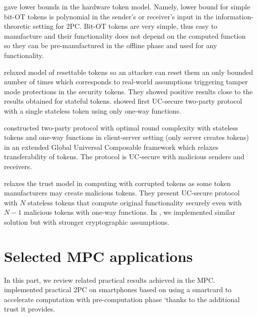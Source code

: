 \documentclass[
  digital, %
  twoside, %
  table,   %
  lof,     %
  lot,     %
]{fithesis3}
\newcounter{ph4_show_guides}
\theoremstyle{definition}
\theoremstyle{remark}
\begin{document}
\cite{AAGPR13} gave lower bounds in the hardware token model. Namely, lower bound for simple bit-OT tokens is polynomial in the sender's or receiver's input in the information-theoretic setting for 2PC. Bit-OT tokens are very simple, thus easy to manufacture and their functionality does not depend on the computed function so they can be pre-manufactured in the offline phase and used for any functionality.

\cite{DKMN15} relaxed model of resettable tokens so an attacker can reset them an only bounded number of times which corresponds to real-world assumptions triggering tamper mode protections in the security tokens. They showed positive results close to the results obtained for stateful tokens. \cite{DKMN15b} showed first UC-secure two-party protocol with a single stateless token using only one-way functions.

\cite{HPV16} constructed two-party protocol with optimal round complexity with stateless tokens and one-way functions in client-server setting (only server creates tokens) in an extended Global Universal Composable framework which relaxes transferability of tokens. The protocol is UC-secure with malicious senders and receivers.

\cite{CCOV17} relaxes the trust model in computing with corrupted tokens as some token manufacturers may create malicious tokens. They present UC-secure protocol with $N$ stateless tokens that compute original functionality securely even with $N-1$ malicious tokens with one-way functions. In \cite{2017-ccs-mavroudis}, we implemented similar solution but with stronger cryptographic assumptions.


\section{Selected MPC applications}\label{sec:soa:applications}
%
In this part, we review related practical results achieved in the MPC.
\cite{DSZ14} implemented practical 2PC on smartphones based on \cite{GMW87} using a smartcard to accelerate computation with pre-computation phase `thanks to the additional trust it provides.
\end{document}
